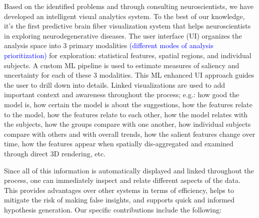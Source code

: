Based on the identified problems and through consulting neuroscientists, we have developed an 
intelligent visual analytics system. To the best of our knowledge, it's the first predictive brain fiber visualization system that helps neuroscientists in exploring neurodegenerative diseases. The user interface (UI) organizes the analysis space into 3 primary modalities \textcolor{blue}{(different modes of analysis prioritization)} for exploration: statistical features, spatial regions, and individual subjects. A custom ML pipeline is used to estimate measures of saliency and uncertainty for each of these 3 modalities. 
This ML enhanced UI approach guides the user to drill down into details. Linked visualizations are used to add important context and awareness throughout the process; e.g.: how good the model is, how certain the model is about the suggestions, how the features relate to the model, how the features relate to each other, how the model relates with the subjects, how the groups compare with one another, how individual subjects compare with others and with overall trends, how the salient features change over time, how the features appear when spatially dis-aggregated and examined through direct 3D rendering, etc. 

Since all of this information is automatically displayed and linked throughout the process, one can immediately inspect and relate different aspects of the data. This provides advantages over other systems in terms of efficiency, helps to mitigate the risk of making false insights, and supports quick and informed hypothesis generation. Our specific contributions include the following:



